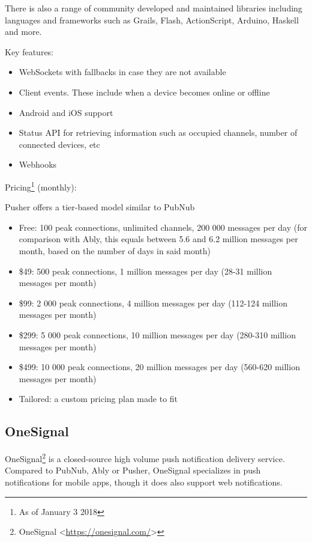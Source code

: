 There is also a range of community developed and maintained libraries including languages and frameworks such as Grails, Flash, ActionScript, Arduino, Haskell and more\cite{pusher-libs2}.

Key features:
\begin{itemize}
\item WebSockets with fallbacks in case they are not available
\item Client events. These include when a device becomes online or offline
\item Android and iOS support
\item Status API for retrieving information such as occupied channels, number of connected devices, etc\cite{pusher-query}
\item Webhooks
\end{itemize}

Pricing\footnote{As of January 3 2018} (monthly):

Pusher offers a tier-based model similar to PubNub

\begin{itemize}
\item Free: 100 peak connections, unlimited channels, 200 000 messages per day (for comparison with Ably, this equals between 5.6 and 6.2 million messages per month, based on the number of days in said month)
\item \$49: 500 peak connections, 1 million messages per day (28-31 million messages per month)
\item \$99: 2 000 peak connections, 4 million messages per day (112-124 million messages per month)
\item \$299: 5 000 peak connections, 10 million messages per day (280-310 million messages per month)
\item \$499: 10 000 peak connections, 20 million messages per day (560-620 million messages per month)
\item Tailored: a custom pricing plan made to fit
\end{itemize}

\subsection{OneSignal}
OneSignal\footnote{OneSignal <\url{https://onesignal.com/}>} is a closed-source high volume push notification delivery service. Compared to PubNub, Ably or Pusher, OneSignal specializes in push notifications for mobile apps, though it does also support web notifications. 

